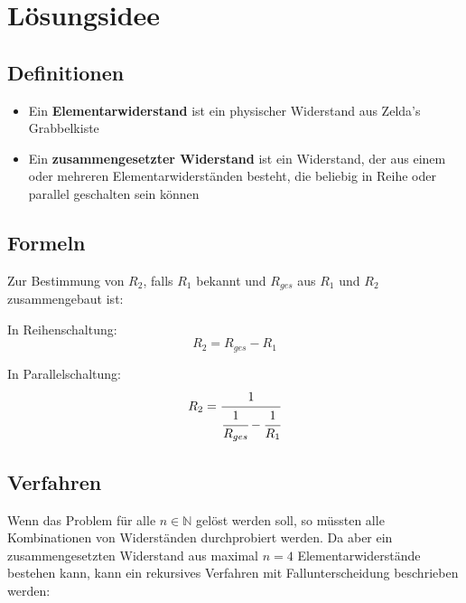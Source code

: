 \documentclass[a4paper,10pt,ngerman]{scrartcl}
\title{\Aufgabe}
\author{\Name\\Team-ID: \TeamId}
\date{\today}
\begin{document}
\maketitle
\tableofcontents

\clearpage

\section{Lösungsidee}

\subsection{Definitionen}
\begin{itemize}
  \item Ein \textbf{Elementarwiderstand} ist ein physischer Widerstand aus Zelda's Grabbelkiste
  \item Ein \textbf{zusammengesetzter Widerstand} ist ein Widerstand, der aus einem oder mehreren Elementarwiderständen besteht, die beliebig in Reihe oder parallel geschalten sein können
\end{itemize}

\subsection{Formeln}
\label{formeln}
Zur Bestimmung von $R_2$, falls $R_1$ bekannt und $R_{ges}$ aus $R_1$ und $R_2$ zusammengebaut ist:
\vspace{10pt}

In Reihenschaltung:
$$R_2 = R_{ges} - R_1$$ 

In Parallelschaltung:
$$R_2 = \cfrac{1}{\cfrac{1}{R_{ges}} - \cfrac{1}{R_1}}$$ 

\subsection{Verfahren}
Wenn das Problem für alle $n \in \mathbb{N}$ gelöst werden soll, so müssten alle Kombinationen von Widerständen durchprobiert werden. Da aber ein zusammengesetzten Widerstand aus maximal $n = 4$ Elementarwiderstände bestehen kann,
kann ein rekursives Verfahren mit Fallunterscheidung beschrieben werden:
\end{document}
